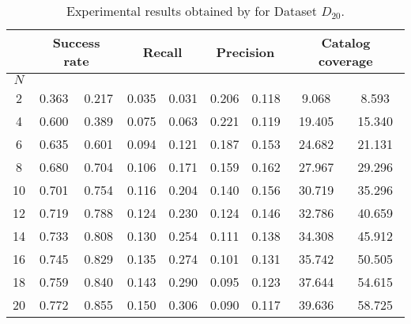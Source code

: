 \begin{table*}[t!]
	\normalsize
	\caption{Experimental results obtained by \TFb for Dataset $D_{20}$.}
	\begin{tabular}{|c| c|c| c|c |c|c |c|c|} \hline		
		& \multicolumn{2}{c|}{\textbf{Success rate}} & \multicolumn{2}{c|}{\textbf{Recall}} & \multicolumn{2}{c|}{\textbf{Precision}} & \multicolumn{2}{c|}{ \textbf{Catalog coverage}} \\ \hline
		$N$  & \MNB     & \TF  & \MNB      & \TF   & \MNB       & \TF    & \MNB       & \TF      \\ \hline         
		
		2  & 0.363      & 0.217  & 0.035     & 0.031  & 0.206       & 0.118   & 9.068          & 8.593      \\ \hline		
		4  & 0.600      & 0.389  & 0.075     & 0.063  & 0.221       & 0.119   & 19.405         & 15.340     \\ \hline
		6  & 0.635      & 0.601  & 0.094     & 0.121  & 0.187       & 0.153   & 24.682         & 21.131     \\ \hline
		\rowcolor{Gray}
		8  & 0.680      & 0.704  & 0.106      & 0.171  & 0.159        & 0.162   & 27.967       & 29.296     \\ \hline
		10 & 0.701      & 0.754  & 0.116      & 0.204  & 0.140        & 0.156   & 30.719       & 35.296  \\ \hline		
		12 & 0.719      & 0.788  & 0.124      & 0.230  & 0.124        & 0.146   & 32.786       & 40.659     \\ \hline		
		14 & 0.733      & 0.808  & 0.130      & 0.254  & 0.111        & 0.138   & 34.308       & 45.912     \\ \hline		
		16 & 0.745      & 0.829  & 0.135      & 0.274  &  0.101       & 0.131   & 35.742       & 50.505     \\ \hline		
		18 & 0.759      & 0.840  & 0.143      & 0.290  & 0.095        & 0.123   & 37.644       & 54.615     \\ \hline
		20 & 0.772      & 0.855 & 0.150       & 0.306  & 0.090        & 0.117   & 39.636       & 58.725    \\ \hline
	\end{tabular}
	\vspace{.2cm}
	\label{tab:combined_dt20}
\end{table*}